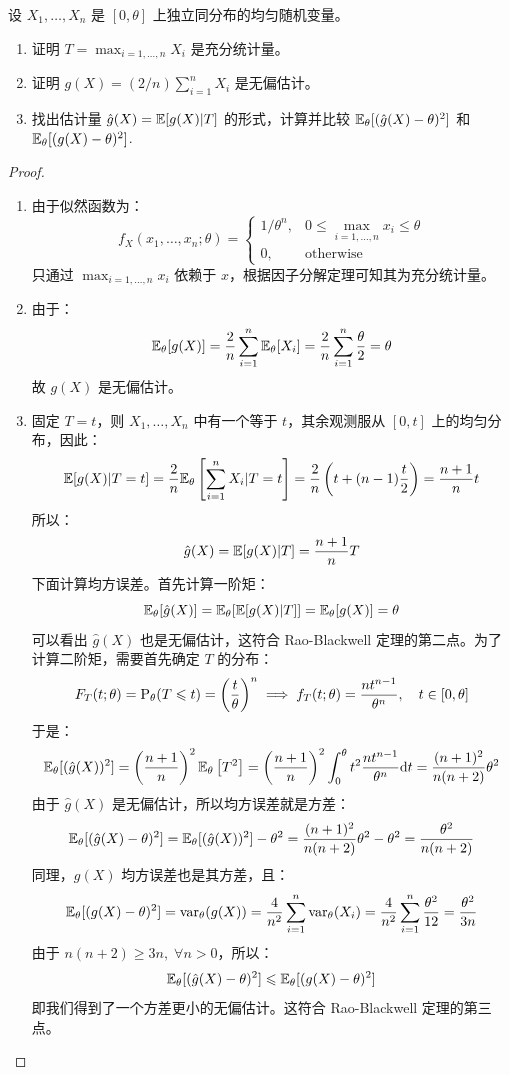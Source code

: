 \begin{example}
设 $X_1,\ldots,X_n$ 是 $[0,\theta]$ 上独立同分布的均匀随机变量。
\begin{enumerate}[label=(\alph*)]
    \item 证明 $T=\max_{i=1,\ldots,n}X_i$ 是充分统计量。
    \item 证明 $g(X)=(2/n)\sum_{i=1}^nX_i$ 是无偏估计。
    \item 找出估计量 $\hat g(X)=\mathbb{E}[g(X)\vert T]$ 的形式，计算并比较 $\mathbb{E}_\theta[(\hat g(X)-\theta)^2]$ 和 $\mathbb{E}_\theta[(g(X)-\theta)^2]$.
\end{enumerate}
\end{example}
\begin{proof}
\,
\begin{enumerate}[label=(\alph*)]
    \item 由于似然函数为：
    \[
    f_X(x_1,\ldots,x_n;\theta)=\begin{cases}
    1/\theta^n,&0\leq \max_{i=1,\ldots,n}x_i\leq\theta\\
    0,&\text{otherwise}
    \end{cases}
    \]
    只通过 $\max_{i=1,\ldots,n}x_i$ 依赖于 $x$，根据因子分解定理可知其为充分统计量。
    \item 由于：
    \[
    \mathbb{E}_\theta[g(X)]=\frac{2}{n}\sum_{i=1}^n\mathbb{E}_\theta[X_i]=\frac{2}{n}\sum_{i=1}^n\frac{\theta}{2}=\theta
    \]
    故 $g(X)$ 是无偏估计。
    \item 固定 $T=t$，则 $X_1,\ldots,X_n$ 中有一个等于 $t$，其余观测服从 $[0,t]$ 上的均匀分布，因此：
    \[
    \mathbb{E}[g(X)\vert T=t]=\frac{2}{n}\mathbb{E}_\theta\left[\sum_{i=1}^nX_i\vert T=t\right]=\frac{2}{n}\left(t+(n-1)\frac{t}{2}\right)=\frac{n+1}{n}t
    \]
    所以：
    \[
    \hat g(X)=\mathbb{E}[g(X)\vert T]=\frac{n+1}{n}T
    \]
    下面计算均方误差。首先计算一阶矩：
    \[
    \mathbb{E}_\theta[\hat g(X)]=\mathbb{E}_\theta[\mathbb{E}[g(X)\vert T]]=\mathbb{E}_\theta[g(X)]=\theta
    \]
    可以看出 $\hat g(X)$ 也是无偏估计，这符合 Rao-Blackwell 定理的第二点。为了计算二阶矩，需要首先确定 $T$ 的分布：
    \[
    F_T(t;\theta)=\mathrm{P}_\theta(T\leqslant t)=\left(\frac{t}{\theta}\right)^n\implies f_T(t;\theta)=\frac{nt^{n-1}}{\theta^n},\quad t\in[0,\theta]
    \]
    于是：
    \[
    \mathbb{E}_\theta[(\hat g(X))^2]=\left(\frac{n+1}{n}\right)^2\mathbb{E}_\theta\left[T^2\right]=\left(\frac{n+1}{n}\right)^2\int_0^\theta t^2\frac{nt^{n-1}}{\theta^n}\mathrm dt=\frac{(n+1)^2}{n(n+2)}\theta^2
    \]
    由于 $\hat g(X)$ 是无偏估计，所以均方误差就是方差：
    \[
    \mathbb{E}_\theta[(\hat g(X)-\theta)^2]=\mathbb{E}_\theta[(\hat g(X))^2]-\theta^2=\frac{(n+1)^2}{n(n+2)}\theta^2-\theta^2=\frac{\theta^2}{n(n+2)}
    \]
    同理，$g(X)$ 均方误差也是其方差，且：
    \[
    \mathbb{E}_\theta[(g(X)-\theta)^2]=\mathrm{var}_\theta(g(X))=\frac{4}{n^2}\sum_{i=1}^n\mathrm{var}_\theta(X_i)=\frac{4}{n^2}\sum_{i=1}^n\frac{\theta^2}{12}=\frac{\theta^2}{3n}
    \]
    由于 $n(n+2)\geq 3n,\;\forall n>0$，所以：
    \[
    \mathbb{E}_\theta[(\hat g(X)-\theta)^2]\leqslant\mathbb{E}_\theta[(g(X)-\theta)^2]
    \]
    即我们得到了一个方差更小的无偏估计。这符合 Rao-Blackwell 定理的第三点。
\end{enumerate}
\end{proof}



